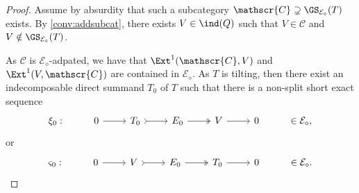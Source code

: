 \begin{proof}
Assume by absurdity that such a subcategory $\mathscr{C} \supsetneq \GS_{\mathcal{E}_\diamond}(T)$ exists. By \cref{conv:addsubcat}, there exists $V \in \ind(Q)$ such that $V \in \mathscr{C}$ and $V \notin \GS_{\mathcal{E}_\diamond}(T)$.

As $\mathscr{C}$ is $\mathcal{E}_\diamond$-adpated, we have that $\Ext^1(\mathscr{C},V)$ and $\Ext^1(V,\mathscr{C})$ are contained in $\mathcal{E}_\diamond$. As $T$ is tilting, then there exist an indecomposable direct summand $T_0$ of $T$ such that there is a non-split short exact sequence \[\begin{tikzcd}
	\xi_0: & 0 & T_0 & E_0 & V &  0 & \in \mathcal{E}_\diamond,
	\arrow[from=1-2, to=1-3]
	\arrow[tail, from=1-3, to=1-4]
	\arrow[two heads,from=1-4, to=1-5]
	\arrow[from=1-5, to=1-6]
\end{tikzcd}\]  or \[\begin{tikzcd}
	\varsigma_0: & 0 & V & E_0 & T_0 &  0 & \in \mathcal{E}_\diamond.
	\arrow[from=1-2, to=1-3]
	\arrow[tail, from=1-3, to=1-4]
	\arrow[two heads,from=1-4, to=1-5]
	\arrow[from=1-5, to=1-6]
\end{tikzcd}\]


\end{proof}
